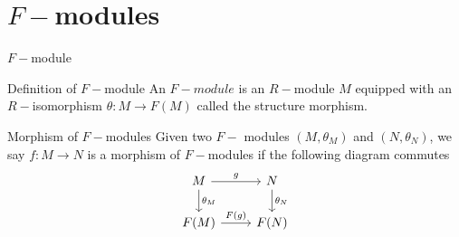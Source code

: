 \documentclass{beamer}
\begin{document}

\section{$F-$modules}

\begin{frame}[fragile]{$F-$module}
\begin{block}{Definition of $F-$module}
An $F-module$ is an $R-$module $M$ equipped with an $R-$isomorphism  $\theta:M \to F(M)$ called the structure morphism.
\end{block}
\begin{block}{Morphism of $F-$modules}
Given two  $F-$ modules  $(M, \theta _M)$ and $(N, \theta _N)$, we say $f:M\to N$ is a morphism of $F-$modules if the following diagram commutes
\[\begin{tikzcd}
	M & N \\
	{F(M)} & {F(N)}
	\arrow["{\theta_M}", from=1-1, to=2-1]
	\arrow["{\theta_N}", from=1-2, to=2-2]
	\arrow["g", from=1-1, to=1-2]
	\arrow["{F(g)}", from=2-1, to=2-2]
\end{tikzcd}\]
\end{block}
\end{frame}
\end{document}
